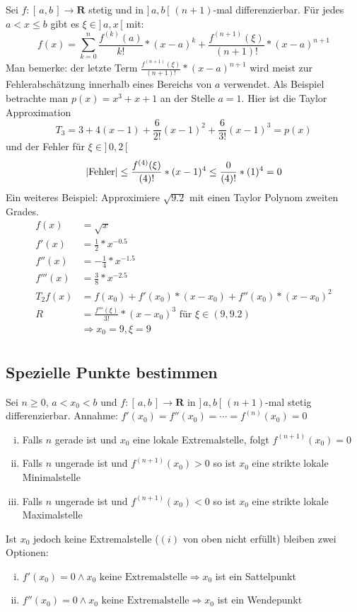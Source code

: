 \documentclass[8pt]{article}
\begin{document}
\begin{multicols*}{3}
Sei $f: [\, a, b\,] \rightarrow \mathbf{R}$ stetig und in $]\, a, b\,[$
$(n+1)$-mal differenzierbar. Für jedes $a < x \leq b$ gibt es $\xi \in ]\,a, x\,[$ mit:
$$
f(x) = \sum_{k = 0}^n \frac{f^{(k)}(a)}{k!} * (x - a)^k + \frac{f^{(n + 1)}(\xi)}{(n + 1)!} * (x - a)^{n + 1}
$$
Man bemerke: der letzte Term $\frac{f^{(n + 1)}(\xi)}{(n + 1)!} * (x - a)^{n + 1}$ wird meist zur Fehlerabschätzung innerhalb eines Bereichs von $a$ verwendet.
Als Beispiel betrachte man $p(x) = x^3 + x + 1$ an der Stelle $a = 1$. Hier ist
die Taylor Approximation $$T_3 = 3 + 4(x - 1) + \frac{6}{2!}(x-1)^2 + \frac{6}{3!}(x-1)^3 = p(x)$$
und der Fehler für $\xi \in ]\,0, 2\,[$
$$
  |\text{Fehler}| \leq \frac{f^{(4)}(\xi)}{(4)!} * (x - 1)^{4} \leq \frac{0}{(4)!} * (1)^{4} = 0\\
$$
Ein weiteres Beispiel: Approximiere $\sqrt{9.2}$ mit einen Taylor Polynom
zweiten Grades.
\begin{align*}
  f(x) &= \sqrt{x}\\
  f'(x) &= \frac{1}{2} * x^{-0.5}\\
  f''(x) &= - \frac{1}{4} * x^{-1.5}\\
  f'''(x) &= \frac{3}{8} * x^{-2.5}\\
  T_2 f(x) &= f(x_0) + f'(x_0) * (x - x_0) + f''(x_0) * (x - x_0)^2\\
  R &= \frac{f'''(\xi)}{3!} * (x - x_0)^3 \text{ für $\xi \in (9, 9.2)$}\\
  &\Rightarrow x_0 = 9, \xi = 9\\
\end{align*}


\subsection{Spezielle Punkte bestimmen}

Sei $n \geq 0$, $a < x_0 < b$ und $f: [\,a, b\,] \rightarrow \mathbf{R}$ in $]\,a, b\,[$ $(n+1)$-mal stetig differenzierbar.
Annahme: $f'(x_0) = f''(x_0) = \cdots = f^{(n)}(x_0) = 0$
\begin{enumerate}[(i)]
  \item Falls $n$ gerade ist und $x_0$ eine lokale Extremalstelle, folgt $f^{(n+1)}(x_0) = 0$
  \item Falls $n$ ungerade ist und $f^{(n+1)}(x_0) > 0$ so ist $x_0$ eine strikte lokale Minimalstelle
  \item Falls $n$ ungerade ist und $f^{(n+1)}(x_0) < 0$ so ist $x_0$ eine strikte lokale Maximalstelle
\end{enumerate}
Ist $x_0$ jedoch keine Extremalstelle ($(i)$ von oben nicht erfüllt) bleiben zwei Optionen:
\begin{enumerate}[(i)]
  \item $f'(x_0) = 0 \land x_0 \text{ keine Extremalstelle} \Rightarrow x_0$ ist ein Sattelpunkt
  \item $f''(x_0) = 0 \land x_0 \text{ keine Extremalstelle} \Rightarrow x_0$ ist ein Wendepunkt
\end{enumerate}


\end{multicols*}
\end{document}
